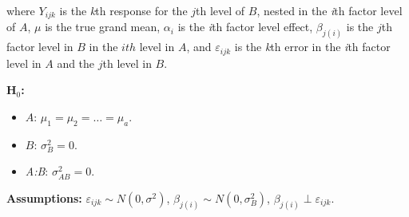 \documentclass[12pt,english]{article}\usepackage[]{graphicx}\usepackage[table]{xcolor}
\begin{document}
\noindent where $Y_{ijk}$ is the \textit{k}th response for the $j$th level of $B$, nested in the \textit{i}th factor level of $A$, $\mu$ is the true grand mean, $\alpha_i$ is the \textit{i}th factor level effect, $\beta_{j(i)}$ is the $j$th factor level in $B$ in the $ith$ level in $A$, and $\varepsilon_{ijk}$ is the \textit{k}th error in the \textit{i}th factor level in $A$ and the $j$th level in $B$. \\
\vspace{0.05in}

\noindent \textbf{H$_0$:}
\begin{itemize}
\item $A$: $\mu_1 = \mu_2 = \dots = \mu_a$.
\item $B$: $\sigma^2_B = 0$.
\item \textit{A:B}: $\sigma^2_{AB} = 0$.
\end{itemize}
\vspace{0.1in}

\noindent \textbf{Assumptions:} $\varepsilon_{ijk} \sim N(0, \sigma^2)$, \hspace{0.1in} $\beta_{j(i)} \sim N(0, \sigma^2_B)$, \hspace{0.1in} $\beta_{j(i)} \perp \varepsilon_{ijk}$.
\vspace{0.1in}
\end{document}
